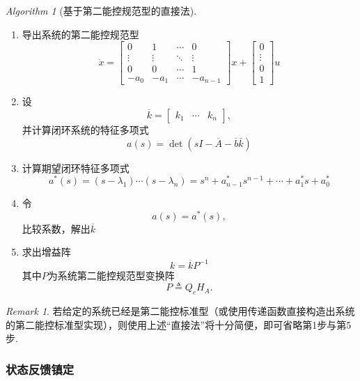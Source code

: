\documentclass[14pt,a4paper]{article}
\theoremstyle{plain}
\theoremstyle{definition}
\theoremstyle{remark}
\newtheorem*{nnr}{Remark}
\theoremstyle{plain}
\theoremstyle{plain}
\theoremstyle{plain}
\theoremstyle{definition}
\theoremstyle{remark}
\newtheorem{alg}{Algorithm}[section]
\numberwithin{equation}{section}
\begin{document}
				\begin{alg}[基于第二能控规范型的直接法]  
				\label{alg:基于第二能控规范型的直接法}
					\ 
					\begin{enumerate}
						\item 导出系统的第二能控规范型
							\[
							\dot x = 
							\begin{bmatrix}
								0 & 1& \cdots & 0\\ 
								\vdots &\vdots&\ddots&\vdots \\ 
								0 & 0& \cdots &1 \\ 
								-a_0 & -a_1 & \cdots  & -a_{n-1}
							\end{bmatrix} x + 
							\begin{bmatrix}
								0\\ \vdots\\ 0\\ 1 
							\end{bmatrix} u
							\]
						\item 设
							\[
							\overline{k} = \begin{bmatrix}
								k_1 & \cdots & k_{n} 
							\end{bmatrix} 
							,\] 
							并计算闭环系统的特征多项式
							\[
								a(s) = \mathop{\text{det}} \left( sI - \overline{A} - \overline{b}\bar{k} \right) 
							\] 
						\item 计算期望闭环特征多项式
							\[
								a^*(s) = (s-\lambda_1)\cdots(s-\lambda_{n}) = s^{n} + a^*_{n-1}s^{n-1}+ \cdots +a^*_1s+a^*_0
							\]
						\item 令
							\[
								a(s) = a^*(s)
							,\] 
							比较系数，解出$\overline{k}$ 
						\item 求出增益阵 
							\[
							k = \overline{k} P^{-1}
							\]
							其中$P$为系统第二能控规范型变换阵
							\[
							P \triangleq Q_c H_A
							.\] 
					\end{enumerate} 
				\end{alg} 

				\begin{nnr}  
					若给定的系统已经是第二能控标准型（或使用传递函数直接构造出系统的第二能控标准型实现），则使用上述``直接法''将十分简便，即可省略第1步与第5步. 
				\end{nnr} 

			\subsubsection{状态反馈镇定}%
			\label{ssub:状态反馈镇定}
\end{document}
